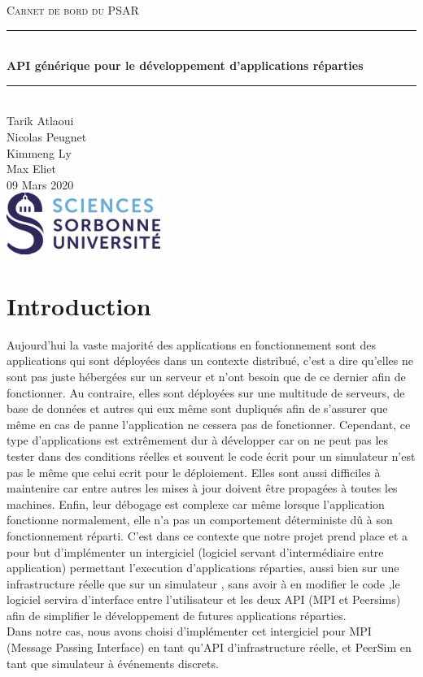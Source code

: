 \documentclass{article}
\date{\today}
\author{Tarik Atlaoui \\ Nicolas Peugnet \\ Kimmeng Ly \\ Max Eliet}
\begin{document}
\begin{titlepage}
	\enlargethispage{2cm}
	\newcommand{\HRule}{\rule{\linewidth}{0.5mm}}
	\center
	\textsc{\LARGE
	Carnet de bord du PSAR 
	} \\[1cm]
	\HRule \\[0.4cm]
	{ \huge \bfseries API générique pour le développement d'applications réparties \\[0.15cm] }
	\HRule \\[4cm]
	\large{Tarik Atlaoui \\[3mm] Nicolas Peugnet \\[3mm] Kimmeng Ly \\[3mm] Max Eliet} \\[3cm]
	09 Mars 2020 \\[3cm]
	\hfill \includegraphics[width=5cm]{logoSU.jpg}
\end{titlepage}

	\newpage
		\section{Introduction}
			\large{
			\indent Aujourd'hui la vaste majorité des applications en fonctionnement sont des applications qui sont déployées dans un contexte distribué, c'est a dire qu'elles
			ne sont pas juste hébergées sur un serveur et n'ont besoin que de ce dernier afin de fonctionner. Au contraire, elles sont déployées sur une multitude de serveurs, de base de données et autres 
			qui eux même sont dupliqués afin de s'assurer que même en cas de panne l'application ne cessera pas de fonctionner.
			Cependant, ce type d'applications est extrêmement dur à développer car on ne peut pas les tester dans des conditions réelles et souvent le code écrit pour un simulateur 
			n'est pas le même que celui ecrit pour le déploiement.
			Elles sont aussi difficiles à maintenire car entre autres les mises à jour doivent être propagées à toutes les machines. Enfin, leur débogage est complexe car même lorsque l'application
			fonctionne normalement, elle n'a pas un comportement déterministe dû à son fonctionnement réparti.
			\indent C'est dans ce contexte que notre projet prend place et a pour but d'implémenter un intergiciel (logiciel servant d'intermédiaire entre application) permettant l'execution d'applications réparties, aussi bien sur une infrastructure réelle que sur un simulateur , sans avoir à en modifier le code ,le logiciel servira d'interface entre l'utilisateur et les deux API (MPI et Peersims) afin de simplifier le développement de futures applications réparties.
\\[2mm]
			 \indent Dans notre cas, nous avons choisi d'implémenter cet intergiciel pour MPI (Message Passing Interface) en tant qu'API d'infrastructure réelle, et PeerSim en tant que simulateur à événements discrets.}
		
\end{document}
